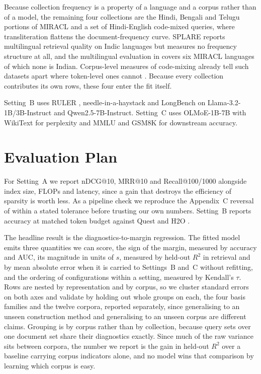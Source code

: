 \documentclass[11pt]{article}
\begin{document}
Because collection frequency is a property of a language and a corpus rather than
of a model, the remaining four collections are the Hindi, Bengali and Telugu
portions of MIRACL \citep{zhang2023miracl} and a set of Hindi-English code-mixed
queries, where transliteration flattens the document-frequency curve.
SPLARE reports multilingual retrieval quality on Indic languages but measures no
frequency structure at all, and the multilingual evaluation in
\citet{zong2026tokens} covers six MIRACL languages of which none is Indian.
Corpus-level measures of code-mixing already tell such datasets apart where
token-level ones cannot \citep{kodali2022symcom}. Because every collection
contributes its own rows, these four enter the fit itself.

Setting~B uses RULER \citep{hsieh2024ruler}, needle-in-a-haystack and LongBench on
Llama-3.2-1B/3B-Instruct and Qwen2.5-7B-Instruct. Setting~C uses OLMoE-1B-7B with
WikiText for perplexity and MMLU and GSM8K for downstream accuracy.

\section{Evaluation Plan}
\label{sec:eval}

For Setting~A we report nDCG@10, MRR@10 and Recall@100/1000 alongside index size,
FLOPs and latency, since a gain that destroys the efficiency of sparsity is worth
less. As a pipeline check we reproduce the Appendix~C reversal of
\citet{clavie2026latent} within a stated tolerance before trusting our own numbers.
Setting~B reports accuracy at matched token budget against Quest and H2O
\citep{tang2024quest,zhang2023h2o}.

The headline result is the diagnostics-to-margin regression. The fitted model emits
three quantities we can score, the sign of the margin, measured by accuracy and
AUC, its magnitude in units of $s$, measured by held-out $R^2$ in retrieval and by
mean absolute error when it is carried to Settings~B and~C without refitting, and
the ordering of configurations within a setting, measured by Kendall's $\tau$. Rows are nested by representation and by corpus,
so we cluster standard errors on both axes and validate by holding out whole groups
on each, the four basis families and the twelve corpora, reported separately, since
generalising to an unseen construction method and generalising to an unseen corpus
are different claims. Grouping is by corpus rather than by collection, because query
sets over one document set share their diagnostics exactly. Since much of the raw
variance sits between corpora, the number we report is the gain in held-out $R^2$
over a baseline carrying corpus indicators alone, and no model wins that comparison
by learning which corpus is easy.
\end{document}
